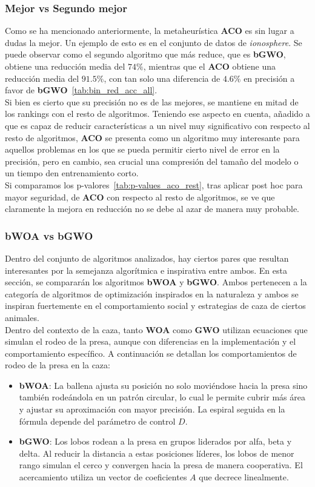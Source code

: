 \subsubsection{Mejor vs Segundo mejor}
Como se ha mencionado anteriormente, la metaheurística \textbf{ACO} es sin lugar a dudas la mejor.
Un ejemplo de esto es en el conjunto de datos de \textit{ionosphere}. Se puede observar como el segundo algoritmo que más reduce, que es \textbf{bGWO}, obtiene una reducción media del $74\%$, mientras que el \textbf{ACO} obtiene una reducción media del $91.5\%$, con tan solo una diferencia de $4.6\%$ en precisión a favor de \textbf{bGWO}~\ref{tab:bin_red_acc_all}. \\[6pt]
Si bien es cierto que su precisión no es de las mejores, se mantiene en mitad de los rankings con el resto de algoritmos. Teniendo ese aspecto en cuenta, añadido a que es capaz de reducir características a un nivel muy significativo con respecto al resto de algoritmos, \textbf{ACO} se presenta como un algoritmo muy interesante para aquellos problemas en los que se pueda permitir cierto nivel de error en la precisión, pero en cambio, sea crucial una compresión del tamaño del modelo o un tiempo den entrenamiento corto.\\[6pt]

Si comparamos los p-valores~\ref{tab:p-values_aco_rest}, tras aplicar post hoc para mayor seguridad, de \textbf{ACO} con respecto al resto de algoritmos, se ve que claramente la mejora en reducción no se debe al azar de manera muy probable.

\subsubsection{bWOA vs bGWO}
Dentro del conjunto de algoritmos analizados, hay ciertos pares que resultan interesantes por la semejanza algorítmica e inspirativa entre ambos. En esta sección, se compararán los algoritmos \textbf{bWOA} y \textbf{bGWO}. Ambos pertenecen a la categoría de algoritmos de optimización inspirados en la naturaleza y ambos se inspiran fuertemente en el comportamiento social y estrategias de caza de ciertos animales.\\[6pt]
Dentro del contexto de la caza, tanto \textbf{WOA} como \textbf{GWO} utilizan ecuaciones que simulan el rodeo de la presa, aunque con diferencias en la implementación y el comportamiento específico. A continuación se detallan los comportamientos de rodeo de la presa en la caza:
\begin{itemize}
    \item \textbf{bWOA}: La ballena ajusta su posición no solo moviéndose hacia la presa sino también rodeándola en un patrón circular, lo cual le permite cubrir más área y ajustar su aproximación con mayor precisión. La espiral seguida en la fórmula depende del parámetro de control $D$.
    \item \textbf{bGWO}: Los lobos rodean a la presa en grupos liderados por alfa, beta y delta. Al reducir la distancia a estas posiciones líderes, los lobos de menor rango simulan el cerco y convergen hacia la presa de manera cooperativa. El acercamiento utiliza un vector de coeficientes $A$ que decrece linealmente.
\end{itemize}

